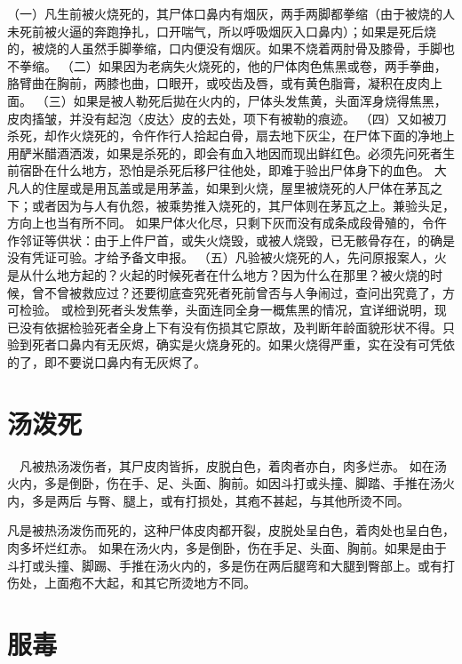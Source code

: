 \documentclass[12pt,UTF8]{ctexbook}
\begin{document}
（一）凡生前被火烧死的，其尸体口鼻内有烟灰，两手两脚都拳缩（由于被烧的人未死前被火逼的奔跑挣扎，口开喘气，所以呼吸烟灰入口鼻内）；如果是死后烧的，被烧的人虽然手脚拳缩，口内便没有烟灰。如果不烧着两肘骨及膝骨，手脚也不拳缩。
（二）如果因为老病失火烧死的，他的尸体肉色焦黑或卷，两手拳曲，胳臂曲在胸前，两膝也曲，口眼开，或咬齿及唇，或有黄色脂膏，凝积在皮肉上面。
（三）如果是被人勒死后拋在火内的，尸体头发焦黄，头面浑身烧得焦黑，皮肉搐皱，并没有起泡〈皮达〉皮的去处，项下有被勒的痕迹。
（四）又如被刀杀死，却作火烧死的，令仵作行人拾起白骨，扇去地下灰尘，在尸体下面的净地上用酽米醋酒洒泼，如果是杀死的，即会有血入地因而现出鲜红色。必须先问死者生前宿卧在什么地方，恐怕是杀死后移尸往他处，即难于验出尸体身下的血色。
大凡人的住屋或是用瓦盖或是用茅盖，如果到火烧，屋里被烧死的人尸体在茅瓦之下；或者因为与人有仇怨，被乘势推入烧死的，其尸体则在茅瓦之上。兼验头足，方向上也当有所不同。
如果尸体火化尽，只剩下灰而没有成条成段骨殖的，令仵作邻证等供状：由于上件尸首，或失火烧毁，或被人烧毁，已无骸骨存在，的确是没有凭证可验。才给予备文申报。
（五）凡验被火烧死的人，先问原报案人，火是从什么地方起的？火起的时候死者在什么地方？因为什么在那里？被火烧的时候，曾不曾被救应过？还要彻底查究死者死前曾否与人争闹过，查问出究竟了，方可检验。
或检到死者头发焦拳，头面连同全身一概焦黑的情况，宜详细说明，现已没有依据检验死者全身上下有没有伤损其它原故，及判断年龄面貌形状不得。只验到死者口鼻内有无灰烬，确实是火烧身死的。如果火烧得严重，实在没有可凭依的了，即不要说口鼻内有无灰烬了。


\chapter{汤泼死}

　凡被热汤泼伤者，其尸皮肉皆拆，皮脱白色，着肉者亦白，肉多烂赤。
如在汤火内，多是倒卧，伤在手、足、头面、胸前。如因斗打或头撞、脚踏、手推在汤火内，多是两后 与臀、腿上，或有打损处，其疱不甚起，与其他所烫不同。


凡是被热汤泼伤而死的，这种尸体皮肉都开裂，皮脱处呈白色，着肉处也呈白色，肉多坏烂红赤。
如果在汤火内，多是倒卧，伤在手足、头面、胸前。如果是由于斗打或头撞、脚踢、手推在汤火内的，多是伤在两后腿弯和大腿到臀部上。或有打伤处，上面疱不大起，和其它所烫地方不同。


\chapter{服毒}
\end{document}
